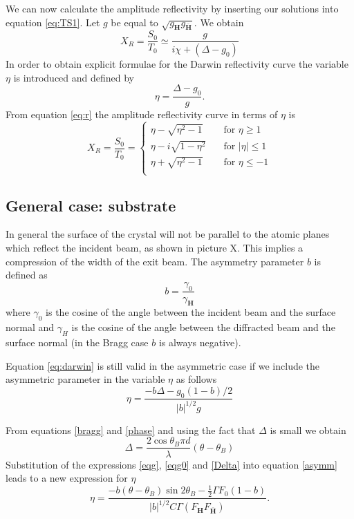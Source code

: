 \documentclass[12pt,oneside,notitlepage,abstracton,a4paper]{scrartcl}
\begin{document}
We can now calculate the amplitude reflectivity by inserting our solutions into equation \ref{eq:TS1}. Let $g$ be equal to $\sqrt{g_\mathbf{H}g_\mathbf{\bar{H}}}$. We obtain
\begin{equation}\label{eq:r}
X_R=\frac{S_0}{T_0} \simeq \frac{g}{i\chi+(\Delta-g_0)}
\end{equation}
In order to obtain explicit formulae for the Darwin reflectivity curve the variable $\eta$ is introduced and defined by
\begin{equation}
\eta=\frac{\Delta-g_0}{g}.
\end{equation}
From equation \ref{eq:r} the amplitude reflectivity curve in terms of $\eta$ is
\begin{equation}\label{eq:darwin}
 X_R=\frac{S_0}{T_0}=
 \begin{cases}
  \eta-\sqrt{\eta^2-1} & \quad \text{for } \eta\ge 1  \\
  \eta-i\sqrt{1-\eta^2} & \quad \text{for } |\eta|\le 1  \\
  \eta+\sqrt{\eta^2-1} & \quad \text{for } \eta\le -1  \\
 \end{cases}
\end{equation}



\subsection{General case: substrate}
In general the surface of the crystal will not be parallel to the atomic planes which reflect the incident beam, as shown in picture X. This implies a compression of the width of the exit beam. The asymmetry parameter $b$ is defined as
\begin{equation}\label{bdef}
 b=\frac{\gamma_0}{\gamma_\mathbf{H}}
\end{equation}
where $\gamma_0$ is the cosine of the angle between the incident beam and the surface normal and $\gamma_H$ is the cosine of the angle between the diffracted beam and the surface normal (in the Bragg case $b$ is always negative).

Equation \ref{eq:darwin} is still valid in the asymmetric case if we include the asymmetric parameter in the variable $\eta$ as follows
\begin{equation}\label{asymm}
 \eta=\frac{-b\Delta-g_0(1-b)/2}{|b|^{1/2}g}
\end{equation}

From equations \ref{bragg} and \ref{phase} and using the fact that $\Delta$ is small we obtain
\begin{equation}\label{Delta}
 \Delta=\frac{2\cos{\theta_B} \pi d}{\lambda}(\theta-\theta_B)
\end{equation}
Substitution of the expressions \ref{eqg}, \ref{eqg0} and \ref{Delta} into equation \ref{asymm} leads to a new expression for $\eta$
\begin{equation}\label{eta}
 \eta=\frac{-b(\theta-\theta_B) \sin{2 \theta_B}-\frac{1}{2}\Gamma F_0(1-b)}{|b|^{1/2}C\Gamma(F_\mathbf{H}F_\mathbf{\bar{H}})}.
\end{equation}
\end{document}
